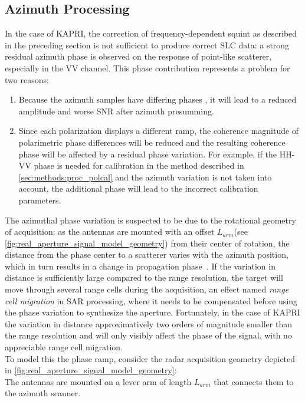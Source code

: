 \subsection{Azimuth Processing}\label{sec:methods:azimuth_processing}
In the case of KAPRI, the correction of frequency-dependent squint as described in the preceding section is not sufficient to produce correct SLC data: a strong residual  azimuth phase is observed on the response of point-like scatterer, especially in the VV channel. This phase contribution represents a problem for two reasons:
\begin{enumerate}
	\item Because the azimuth samples have differing phases
	, it will lead to a reduced amplitude and worse SNR after azimuth presumming. 
  \item Since each polarization displays a different ramp, the coherence magnitude of polarimetric phase differences will be reduced and the resulting coherence phase will be affected by a residual phase variation. For example, if the HH-VV phase is needed for calibration in the method described in \autoref{sec:methods:proc_polcal} and the azimuth variation is not taken into account, the additional phase will lead to the incorrect calibration parameters.\label{item:phase_variation}
\end{enumerate}
The azimuthal phase variation is suspected to be due to the rotational geometry of acquisition: as the antennas are mounted with an  offset $L_{arm}$(see \autoref{fig:real_aperture_signal_model_geometry}) from their center of rotation, the distance from the phase center to a scatterer varies with the azimuth position, which in turn results in a change in propagation phase~\cite{Lee2014}. If the variation in distance is sufficiently large compared to the range resolution, the target will move through several range cells during the acquisition, an effect named \emph{range cell migration} in SAR processing, where it needs to be compensated before using the phase variation to synthesize the aperture. Fortunately, in the case of KAPRI the variation in distance approximatively two orders of magnitude smaller than the range resolution and will only visibly affect the phase of the signal, with no appreciable range cell migration.\\
To model this the phase ramp, consider the radar acquisition geometry depicted in \autoref{fig:real_aperture_signal_model_geometry}:\\
The antennas are mounted on a lever arm of length $L_{arm}$ that connects them to the azimuth scanner.

